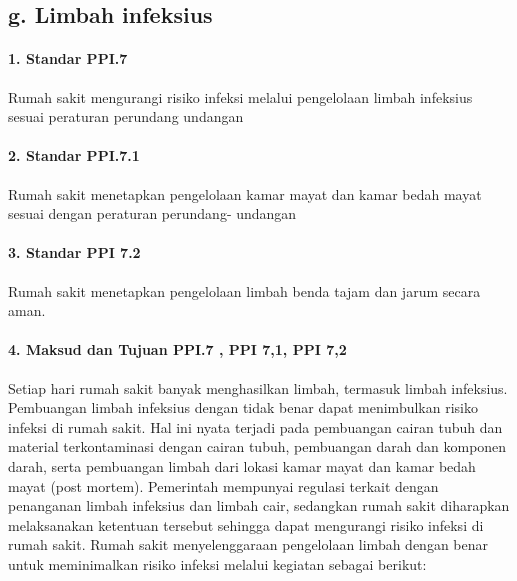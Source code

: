 \documentclass[
]{book}
\begin{document}
\hypertarget{g.-limbah-infeksius}{%
\subsection*{g. Limbah infeksius}\label{g.-limbah-infeksius}}

\hypertarget{standar-ppi.7}{%
\paragraph*{1. Standar PPI.7}\label{standar-ppi.7}}

Rumah sakit mengurangi risiko infeksi melalui pengelolaan limbah infeksius sesuai peraturan perundang undangan

\hypertarget{standar-ppi.7.1}{%
\paragraph*{2. Standar PPI.7.1}\label{standar-ppi.7.1}}

Rumah sakit menetapkan pengelolaan kamar mayat dan kamar bedah mayat sesuai dengan peraturan perundang- undangan

\hypertarget{standar-ppi-7.2}{%
\paragraph*{3. Standar PPI 7.2}\label{standar-ppi-7.2}}

Rumah sakit menetapkan pengelolaan limbah benda tajam dan jarum secara aman.

\hypertarget{maksud-dan-tujuan-ppi.7-ppi-71-ppi-72}{%
\paragraph*{4. Maksud dan Tujuan PPI.7 , PPI 7,1, PPI 7,2}\label{maksud-dan-tujuan-ppi.7-ppi-71-ppi-72}}

Setiap hari rumah sakit banyak menghasilkan limbah, termasuk limbah infeksius. Pembuangan limbah infeksius dengan tidak benar dapat menimbulkan risiko infeksi di rumah sakit. Hal ini nyata terjadi pada pembuangan cairan tubuh dan material terkontaminasi dengan cairan tubuh, pembuangan darah dan komponen darah, serta pembuangan limbah dari lokasi kamar mayat dan kamar bedah mayat (post mortem). Pemerintah mempunyai regulasi terkait dengan penanganan limbah infeksius dan limbah cair, sedangkan rumah sakit diharapkan melaksanakan ketentuan tersebut sehingga dapat mengurangi risiko infeksi di rumah sakit.
Rumah sakit menyelenggaraan pengelolaan limbah dengan benar untuk meminimalkan risiko infeksi melalui kegiatan sebagai berikut:
\end{document}
